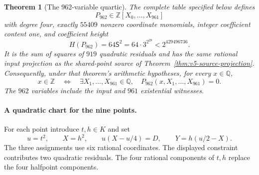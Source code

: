 \documentclass[11pt]{article}
\newtheorem{theorem}{Theorem}[section]
\theoremstyle{definition}
\theoremstyle{remark}
\newcommand{\Q}{\mathbb Q}
\newcommand{\Z}{\mathbb Z}
\begin{document}
\begin{theorem}[The 962-variable quartic]
\label{thm:v6-962-polynomial}
The complete table specified below defines
\[
 P_{962}\in\Z[X_0,\ldots,X_{961}]
\]
with degree four, exactly $55409$ nonzero coordinate monomials, integer
coefficient content one, and coefficient height
\[
 H(P_{962})=64\mathsf S^2=64\cdot3^{2^{28}}<2^{429496736}.
\]
It is the sum of squares of $919$ quadratic residuals and has the same
rational input projection as the shared-point source of
Theorem~\ref{thm:v5-source-projection}. Consequently, under that theorem's
arithmetic hypotheses, for every $x\in\Q$,
\[
 x\in\Z\quad\Longleftrightarrow\quad
 \exists X_1,\ldots,X_{961}\in\Q,\quad
 P_{962}(x,X_1,\ldots,X_{961})=0.
\]
The $962$ variables include the input and $961$ existential witnesses.
\end{theorem}

\paragraph{A quadratic chart for the nine points.}
For each point introduce $t,h\in K$ and set
\begin{equation}\label{eq:v6-point-chart}
 u=t^2,\qquad X=h^2,\qquad
 u(X-u/4)=D,\qquad Y=h(u/2-X).
\end{equation}
The three assignments use six rational coordinates. The displayed
constraint contributes two quadratic residuals. The four rational
components of $t,h$ replace the four halfpoint components.
\end{document}
